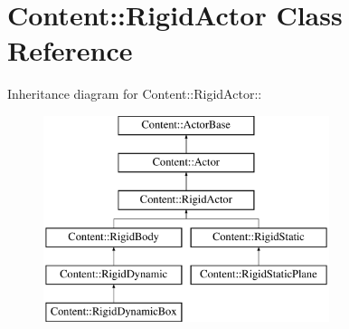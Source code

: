 \hypertarget{classContent_1_1RigidActor}{
\section{Content::RigidActor Class Reference}
\label{classContent_1_1RigidActor}
}
Inheritance diagram for Content::RigidActor::\begin{figure}[H]
\begin{center}
\leavevmode
\includegraphics[height=6cm]{classContent_1_1RigidActor}
\end{center}
\end{figure}
